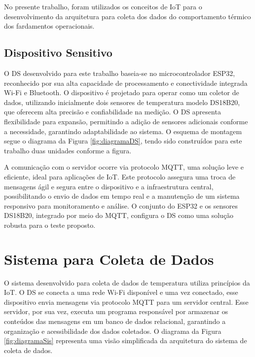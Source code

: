 	  \tab No presente trabalho, foram utilizados os conceitos de \acrlong{IoT} para o desenvolvimento da arquitetura para coleta dos dados do comportamento térmico
	   dos fardamentos operacionais.

\subsection{Dispositivo Sensitivo}

	O \acrfull{DS} desenvolvido para este trabalho baseia-se no microcontrolador ESP32, reconhecido por sua alta capacidade de processamento e conectividade
	 integrada Wi-Fi e Bluetooth. O dispositivo é projetado para operar como um coletor de dados, utilizando inicialmente dois sensores de temperatura modelo DS18B20,
	  que oferecem alta precisão e confiabilidade na medição. O \acrshort{DS} apresenta flexibilidade para expansão, permitindo a adição de sensores adicionais conforme a
	   necessidade, garantindo adaptabilidade ao sistema. O esquema de montagem segue o diagrama da Figura \ref{fig:diagramaDS}, tendo sido construídos para
	    este trabalho duas unidades conforme a figura.


\begin{centering}
\end{centering}

	\tab A comunicação com o servidor ocorre via protocolo \acrfull{MQTT}, uma solução leve e eficiente, ideal para aplicações de
	 \acrlong{IoT}. Este protocolo assegura uma troca de mensagens ágil e segura entre o dispositivo e a infraestrutura central, 
	 possibilitando o envio de dados em tempo real e a manutenção de um sistema responsivo para monitoramento e análise. O conjunto do ESP32 e
	  os sensores DS18B20, integrado por meio do \acrshort{MQTT}, configura o \acrshort{DS} como uma solução robusta para o teste proposto.
	
\section{Sistema para Coleta de Dados}

	O sistema desenvolvido para coleta de dados de temperatura utiliza princípios da \acrlong{IoT}. 
	O \acrlong{DS} se conecta a uma rede Wi-Fi disponível e uma vez conectado, esse dispositivo envia 
	mensagens via protocolo \acrshort{MQTT} para um servidor central. Esse servidor, por sua vez, executa um programa responsável por armazenar os conteúdos das mensagens em um banco de dados relacional, garantindo a organização e acessibilidade dos dados coletados. O diagrama da Figura \ref{fig:diagramaSis} representa uma visão simplificada da arquitetura do sistema de coleta de dados.

